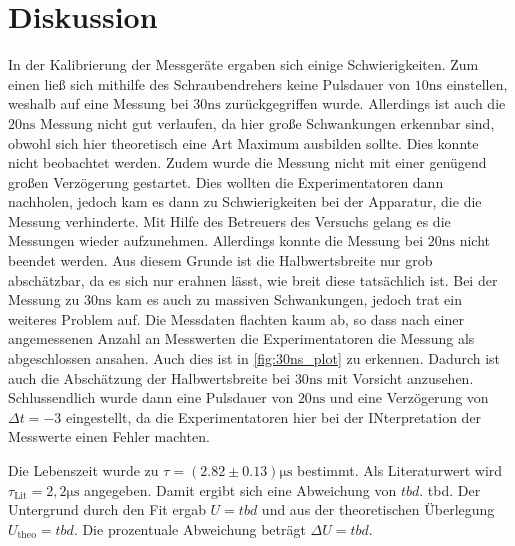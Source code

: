 \section{Diskussion}
\label{sec:Diskussion}

In der Kalibrierung der Messgeräte ergaben sich einige Schwierigkeiten.
Zum einen ließ sich mithilfe des Schraubendrehers keine Pulsdauer von $10 \unit{\nano\second}$ einstellen, weshalb auf eine Messung bei $30 \unit{\nano\second}$ zurückgegriffen wurde.
Allerdings ist auch die $20 \unit{\nano\second}$ Messung nicht gut verlaufen, da hier große Schwankungen erkennbar sind, obwohl sich hier theoretisch eine Art Maximum ausbilden sollte.
Dies konnte nicht beobachtet werden.
Zudem wurde die Messung nicht mit einer genügend großen Verzögerung gestartet.
Dies wollten die Experimentatoren dann nachholen, jedoch kam es dann zu Schwierigkeiten bei der Apparatur, die die Messung verhinderte.
Mit Hilfe des Betreuers des Versuchs gelang es die Messungen wieder aufzunehmen.
Allerdings konnte die Messung bei $20 \unit{\nano\second}$ nicht beendet werden.
Aus diesem Grunde ist die Halbwertsbreite nur grob abschätzbar, da es sich nur erahnen lässt, wie breit diese tatsächlich ist.
Bei der Messung zu $30 \unit{\nano\second}$ kam es auch zu massiven Schwankungen, jedoch trat ein weiteres Problem auf.
Die Messdaten flachten kaum ab, so dass nach einer angemessenen Anzahl an Messwerten die Experimentatoren die Messung als abgeschlossen ansahen.
Auch dies ist in \autoref{fig:30ns_plot} zu erkennen.
Dadurch ist auch die Abschätzung der Halbwertsbreite bei $30 \unit{\nano\second}$ mit Vorsicht anzusehen.
Schlussendlich wurde dann eine Pulsdauer von $20 \unit{\nano\second}$ und eine Verzögerung von $\Delta t = -3$ eingestellt, da die Experimentatoren hier bei der INterpretation der Messwerte einen Fehler machten.

Die Lebenszeit wurde zu $\tau = (2.82 \pm 0.13) \unit{\micro\second}$ bestimmt.
Als Literaturwert wird $\tau_\text{Lit} = 2,2 \unit{\micro\second}$ angegeben.
Damit ergibt sich eine Abweichung von $tbd$.
tbd.
Der Untergrund durch den Fit ergab $U = tbd$ und aus der theoretischen Überlegung $U_\text{theo} = tbd$.
Die prozentuale Abweichung beträgt $\Delta U = tbd$.